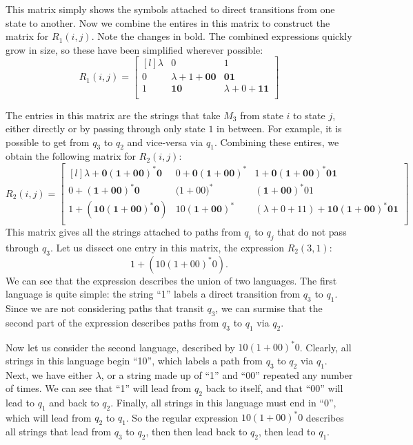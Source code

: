 \documentclass{bcthesis}
\begin{document}
\begin{example}
		This matrix simply shows the symbols attached to direct transitions from one state to another.
		Now we combine the entires in this matrix to construct the matrix for $R_1(i, j)$.
		Note the changes in bold. 
		The combined expressions quickly grow in size, so these have been simplified wherever possible:
		\[
			R_1 (i, j) = 
			\begin{bmatrix*}[l]
				\lambda 	& 0							& 1 						\\
				0 			& \lambda+1+\bm{00} 	& \bm{01}				\\
				1 			& \bm{10} 				& \lambda+0+\bm{11} 	\\
			\end{bmatrix*}
		\]

		The entries in this matrix are the strings that take $M_3$ from state $i$ to state $j$, either directly or by passing through only state $1$ in between.
		For example, it is possible to get from $q_3$ to $q_2$ and vice-versa via $q_1$.
		Combining these entires, we obtain the following matrix for $R_2(i, j)$:
		\[
			R_2 (i, j) = 
			\begin{bmatrix*}[l]
				\lambda + \bm{0(1+00)^*0} 	& 0+\bm{0(1+00)^*}		& 1+\bm{0(1+00)^*01}		\\
				0+\bm{(1+00)^*0} 			& \bm{(}1+00\bm{)^{*}} 	& \bm{(1+00)^*}01			\\
				1+\bm{(10(1+00)^*0)} 		& 10\bm{(1+00)^*} 		& (\lambda+0+11)+\bm{10(1+00)^*01} 	\\
			\end{bmatrix*}
		\]
		This matrix gives all the strings attached to paths from $q_i$ to $q_j$ that do not pass through $q_3$.
		Let us dissect one entry in this matrix, the expression $R_2(3, 1)$:
		\[
			1+(10(1+00)^*0).
		\]
		We can see that the expression describes the union of two languages.
		The first language is quite simple: the string ``1'' labels a direct transition from $q_3$ to $q_1$.
		Since we are not considering paths that transit $q_3$, we can surmise that the second part of the expression describes paths from $q_3$ to $q_1$ via $q_2$.

		Now let us consider the second language, described by $10 (1+00)^* 0$.
		Clearly, all strings in this language begin ``10'', which labels a path from $q_3$ to $q_2$ via $q_1$.
		Next, we have either $\lambda$, or a string made up of ``1'' and ``00'' repeated any number of times.
		We can see that ``1'' will lead from $q_2$ back to itself, and that ``00'' will lead to $q_1$ and back to $q_2$.
		Finally, all strings in this language must end in ``0'', which will lead from $q_2$ to $q_1$.
		So the regular expression $10 (1+00)^* 0$ describes all strings that lead from $q_3$ to $q_2$, then then lead back to $q_2$, then lead to $q_1$.


\end{example}
\end{document}
